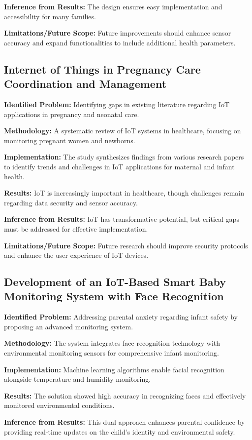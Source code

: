 \documentclass[conference]{IEEEtran}
\begin{document}
\textbf{Inference from Results:} The design ensures easy implementation and accessibility for many families.

\textbf{Limitations/Future Scope:} Future improvements should enhance sensor accuracy and expand functionalities to include additional health parameters.

\subsection{Internet of Things in Pregnancy Care Coordination and Management}
\textbf{Identified Problem:} Identifying gaps in existing literature regarding IoT applications in pregnancy and neonatal care.

\textbf{Methodology:} A systematic review of IoT systems in healthcare, focusing on monitoring pregnant women and newborns.

\textbf{Implementation:} The study synthesizes findings from various research papers to identify trends and challenges in IoT applications for maternal and infant health.

\textbf{Results:} IoT is increasingly important in healthcare, though challenges remain regarding data security and sensor accuracy.

\textbf{Inference from Results:} IoT has transformative potential, but critical gaps must be addressed for effective implementation.

\textbf{Limitations/Future Scope:} Future research should improve security protocols and enhance the user experience of IoT devices.

\subsection{Development of an IoT-Based Smart Baby Monitoring System with Face Recognition}
\textbf{Identified Problem:} Addressing parental anxiety regarding infant safety by proposing an advanced monitoring system.

\textbf{Methodology:} The system integrates face recognition technology with environmental monitoring sensors for comprehensive infant monitoring.

\textbf{Implementation:} Machine learning algorithms enable facial recognition alongside temperature and humidity monitoring.

\textbf{Results:} The solution showed high accuracy in recognizing faces and effectively monitored environmental conditions.

\textbf{Inference from Results:} This dual approach enhances parental confidence by providing real-time updates on the child’s identity and environmental safety.
\end{document}
